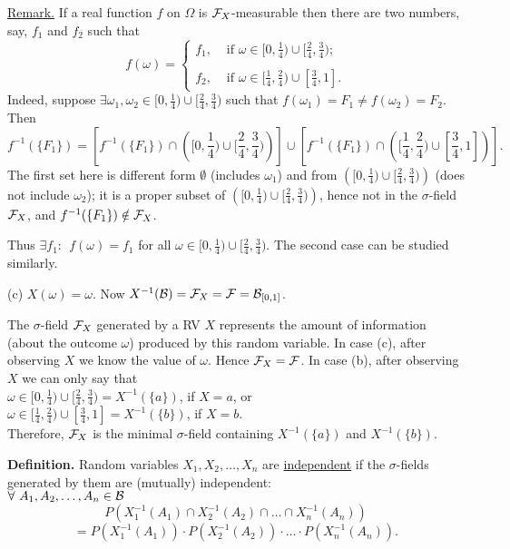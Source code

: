 \documentclass[a4paper,10pt]{article}
\newcommand{\1}[1]{\mathbf{1}_{\{#1\}}}
\begin{document}
\underline{Remark.} If a real function $f$ on $\Omega$ is ${\cal F}_X$-measurable then there are two numbers, say, $f_1$ and $f_2$ such that
  $$f(\omega)=\left\{\begin{array}{ll} f_1, & \mbox{ if } \omega\in[0,\frac{1}{4})\cup [\frac{2}{4},\frac{3}{4});\\ \\ f_2, & \mbox{ if } \omega\in[\frac{1}{4},\frac{2}{4})\cup [\frac{3}{4},1]. \end{array}\right. $$
Indeed, suppose $\exists\omega_1,\omega_2\in[0,\frac{1}{4})\cup [\frac{2}{4},\frac{3}{4})$ such that $f(\omega_1)=F_1\ne f(\omega_2)=F_2$. Then
  $$f^{-1}(\{F_1\})=\left[ f^{-1}(\{F_1\})\cap \left([0,\frac{1}{4})\cup [\frac{2}{4},\frac{3}{4})\right)\right]\cup \left[ f^{-1}(\{F_1\})\cap \left([\frac{1}{4},\frac{2}{4})\cup [\frac{3}{4},1]\right)\right].$$
The first set here is different form $\emptyset$ (includes $\omega_1$) and from $\left([0,\frac{1}{4})\cup [\frac{2}{4},\frac{3}{4})\right)$ (does not include $\omega_2$); it is a proper subset of $\left([0,\frac{1}{4})\cup [\frac{2}{4},\frac{3}{4})\right)$, hence not in the $\sigma$-field ${\cal F}_X$, and $f^{-1}(\{F_1\})\notin{\cal F}_X$.

Thus $\exists f_1:~~f(\omega)=f_1$ for all $\omega\in[0,\frac{1}{4})\cup [\frac{2}{4},\frac{3}{4})$. The second case can be studied similarly. \vspace{3mm}

(c) $X(\omega)=\omega$. Now $X^{-1}({\cal B})={\cal F}_X={\cal F}={\cal B}_{[0,1]}$.\vspace{4cm}

The $\sigma$-field ${\cal F}_X$ generated  by a RV $X$ represents the amount of information (about the outcome $\omega$) produced by this random variable.
In case (c), after observing $X$ we know the value of $\omega$. Hence ${\cal F}_X={\cal F}$. In case (b), after observing $X$ we can only say that\\
$\omega\in[0,\frac{1}{4})\cup [\frac{2}{4},\frac{3}{4})=X^{-1}(\{a\})$, if $X=a$, or \\
$\omega\in[\frac{1}{4},\frac{2}{4})\cup [\frac{3}{4},1]=X^{-1}(\{b\})$, if $X=b$.\\
Therefore, ${\cal F}_X$ is the minimal $\sigma$-field containing $X^{-1}(\{a\})$ and $X^{-1}(\{b\})$.\vspace{3mm}

{\bf Definition.} Random variables $X_1,X_2,\ldots,X_n$ are \underline{independent} if the $\sigma$-fields generated by them are (mutually) independent:\\
  $\forall ~A_1,A_2,\ldots,A_n\in{\cal B}$
  $$P(X_1^{-1}(A_1)\cap X_2^{-1}(A_2)\cap \ldots\cap X_n^{-1}(A_n))$$
  $$=P(X_1^{-1}(A_1))\cdot P(X_2^{-1}(A_2))\cdot\ldots\cdot P(X_n^{-1}(A_n)).$$
\vspace{3mm}
\end{document}
